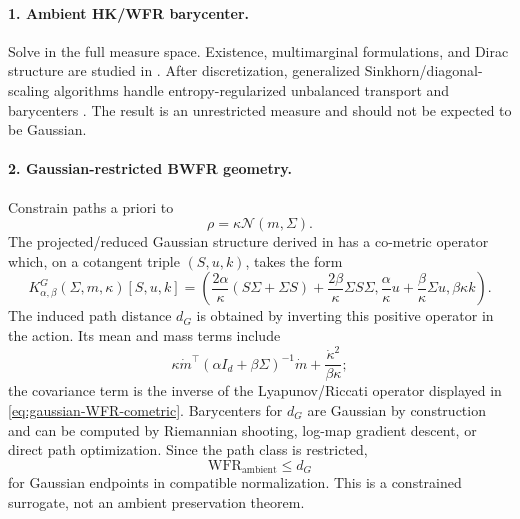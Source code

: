 \documentclass[11pt]{article}
\theoremstyle{definition}
\newcommand{\Id}{I_d}
\newcommand{\cN}{\mathcal N}
\begin{document}
\paragraph{1. Ambient HK/WFR barycenter.}
Solve in the full measure space.  Existence, multimarginal formulations, and
Dirac structure are studied in
\cite{FrieseckeMatthesSchmitzer2021,ChungPhung2021}.  After discretization,
generalized Sinkhorn/diagonal-scaling algorithms handle entropy-regularized
unbalanced transport and barycenters \cite{ChizatEtAl2018}.  The result is an
unrestricted measure and should not be expected to be Gaussian.

\paragraph{2. Gaussian-restricted BWFR geometry.}
Constrain paths a priori to
\begin{equation}\label{eq:scaled-gaussian-family}
 \rho=\kappa\cN(m,\Sigma).
\end{equation}
The projected/reduced Gaussian structure derived in
\cite{LieroMielkeTseZhu2025} has a co-metric operator which, on a cotangent
triple $(S,u,k)$, takes the form
\begin{equation}\label{eq:gaussian-WFR-cometric}
 K^G_{\alpha,\beta}(\Sigma,m,\kappa)[S,u,k]
 =\left(
 \frac{2\alpha}{\kappa}(S\Sigma+\Sigma S)
 +\frac{2\beta}{\kappa}\Sigma S\Sigma,
 \frac\alpha\kappa u+\frac\beta\kappa\Sigma u,
 \beta\kappa k
 \right).
\end{equation}
The induced path distance $d_G$ is obtained by inverting this positive
operator in the action.  Its mean and mass terms include
\begin{equation}\label{eq:gaussian-WFR-primal-pieces}
 \kappa\dot m^\top(\alpha\Id+\beta\Sigma)^{-1}\dot m
 +\frac{\dot\kappa^2}{\beta\kappa};
\end{equation}
the covariance term is the inverse of the Lyapunov/Riccati operator displayed
in \eqref{eq:gaussian-WFR-cometric}.  Barycenters for $d_G$ are Gaussian by
construction and can be computed by Riemannian shooting, log-map gradient
descent, or direct path optimization.  Since the path class is restricted,
\begin{equation}\label{eq:restricted-upper}
 \mathrm{WFR}_{\mathrm{ambient}}\leq d_G
\end{equation}
for Gaussian endpoints in compatible normalization.  This is a constrained
surrogate, not an ambient preservation theorem.
\end{document}
